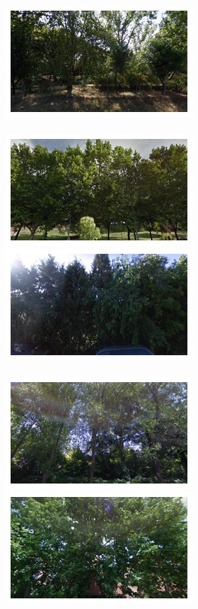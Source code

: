 \begin{figure}
\begin{minipage}{\linewidth}
\begin{minipage}{0.3\linewidth}
      \includegraphics[width=0.49\linewidth]{imgs/vege/mosaicsT2/mosaic0005.jpg}
      \\ \vspace{-3mm} \\
      \includegraphics[width=0.49\linewidth]{imgs/vege/mosaicsT2/mosaic0006.jpg}
      \includegraphics[width=0.49\linewidth]{imgs/vege/mosaicsT2/mosaic0007.jpg}
      \\ \vspace{-3mm} \\
      \includegraphics[width=0.49\linewidth]{imgs/vege/mosaicsT2/mosaic0008.jpg}
      \includegraphics[width=0.49\linewidth]{imgs/vege/mosaicsT2/mosaic0009.jpg}

\end{minipage}
\end{minipage}
\end{figure}
